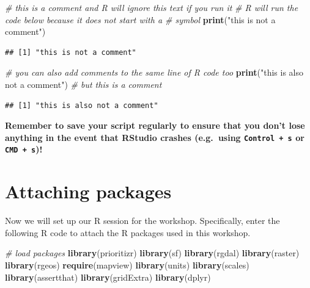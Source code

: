 \documentclass[
  12pt,
]{book}
\newenvironment{Shaded}{\begin{snugshade}}{\end{snugshade}}
\newcommand{\CommentTok}[1]{\textcolor[rgb]{0.56,0.35,0.01}{\textit{#1}}}
\newcommand{\KeywordTok}[1]{\textcolor[rgb]{0.13,0.29,0.53}{\textbf{#1}}}
\newcommand{\NormalTok}[1]{#1}
\newcommand{\StringTok}[1]{\textcolor[rgb]{0.31,0.60,0.02}{#1}}
\begin{document}
\begin{Shaded}
\begin{Highlighting}[]
\CommentTok{# this is a comment and R will ignore this text if you run it}
\CommentTok{# R will run the code below because it does not start with a # symbol}
\KeywordTok{print}\NormalTok{(}\StringTok{"this is not a comment"}\NormalTok{)}
\end{Highlighting}
\end{Shaded}

\begin{verbatim}
## [1] "this is not a comment"
\end{verbatim}

\begin{Shaded}
\begin{Highlighting}[]
\CommentTok{# you can also add comments to the same line of R code too}
\KeywordTok{print}\NormalTok{(}\StringTok{"this is also not a comment"}\NormalTok{) }\CommentTok{# but this is a comment}
\end{Highlighting}
\end{Shaded}

\begin{verbatim}
## [1] "this is also not a comment"
\end{verbatim}

\textbf{Remember to save your script regularly to ensure that you don't lose anything in the event that RStudio crashes (e.g.~using \texttt{Control\ +\ s} or \texttt{CMD\ +\ s})!}

\hypertarget{attaching-packages}{%
\section{Attaching packages}\label{attaching-packages}}

Now we will set up our R session for the workshop. Specifically, enter the following R code to attach the R packages used in this workshop.

\begin{Shaded}
\begin{Highlighting}[]
\CommentTok{# load packages}
\KeywordTok{library}\NormalTok{(prioritizr)}
\KeywordTok{library}\NormalTok{(sf)}
\KeywordTok{library}\NormalTok{(rgdal)}
\KeywordTok{library}\NormalTok{(raster)}
\KeywordTok{library}\NormalTok{(rgeos)}
\KeywordTok{require}\NormalTok{(mapview)}
\KeywordTok{library}\NormalTok{(units)}
\KeywordTok{library}\NormalTok{(scales)}
\KeywordTok{library}\NormalTok{(assertthat)}
\KeywordTok{library}\NormalTok{(gridExtra)}
\KeywordTok{library}\NormalTok{(dplyr)}
\end{Highlighting}
\end{Shaded}
\end{document}
